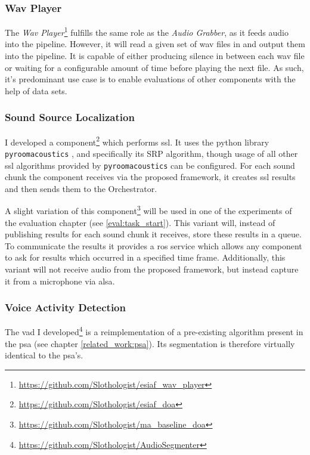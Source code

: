 \subsubsection{Wav Player}
\label{main:components:wav}
The \textit{Wav Player}\footnote{\url{https://github.com/Slothologist/esiaf_wav_player}} fulfills the same role as the \textit{Audio Grabber}, as it feeds audio into the pipeline.
However, it will read a given set of wav files in and output them into the pipeline.
It is capable of either producing silence in between each wav file or waiting for a configurable amount of time before playing the next file.
As such, it's predominant use case is to enable evaluations of other components with the help of data sets.

\subsubsection{Sound Source Localization}
\label{main:components:ssl}
I developed a component\footnote{\url{https://github.com/Slothologist/esiaf_doa}} which performs \gls{ssl}.
It uses the python library \texttt{pyroomacoustics} \cite{pyroomacoustics}, and specifically its SRP algorithm, though usage of all other \gls{ssl} algorithms provided by \texttt{pyroomacoustics} can be configured.
For each sound chunk the component receives via the proposed framework, it creates \gls{ssl} results and then sends them to the Orchestrator.

A slight variation of this component\footnote{\url{https://github.com/Slothologist/ma_baseline_doa}}  will be used in one of the experiments of the evaluation chapter (see \ref{eval:task_start}).
This variant will, instead of publishing results for each sound chunk it receives, store these results in a queue.
To communicate the results it provides a \gls{ros} service which allows any component to ask for results which occurred in a specified time frame.
Additionally, this variant will not receive audio from the proposed framework, but instead capture it from a microphone via \gls{alsa}.

\subsubsection{Voice Activity Detection}
\label{main:components:vad}
The \gls{vad} I developed\footnote{\url{https://github.com/Slothologist/AudioSegmenter}} is a reimplementation of a pre-existing algorithm present in the \gls{psa} (see chapter \ref{related_work:psa}).
Its segmentation is therefore virtually identical to the \gls{psa}'s.

